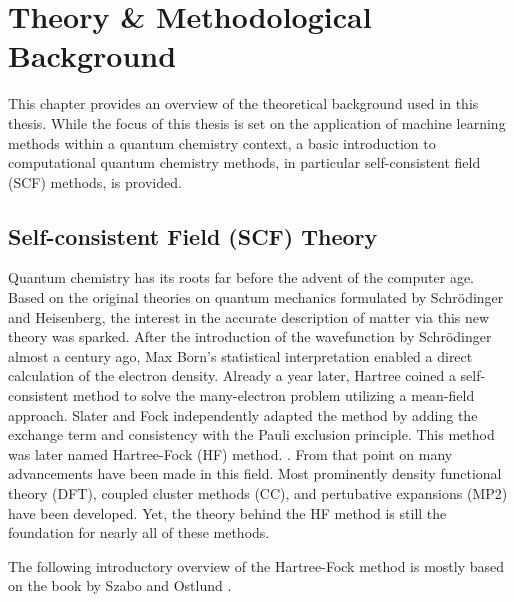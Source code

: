 \chapter{Theory \& Methodological Background}
\label{sec:background}
This chapter provides an overview of the theoretical background used in this thesis. While the focus of this thesis is set on the application of machine learning methods within a quantum chemistry context, a basic introduction to computational quantum chemistry methods, in particular self-consistent field (SCF) methods, is provided. 

\section{Self-consistent Field (SCF) Theory}
\label{sec:background_scf}
Quantum chemistry has its roots far before the advent of the computer age. Based on the original theories on quantum mechanics formulated by Schrödinger and Heisenberg, the interest in the accurate description of matter via this new theory was sparked. After the introduction of the wavefunction by Schrödinger almost a century ago, Max Born's statistical interpretation enabled a direct calculation of the electron density. \parencite{ref:schroedinger_1926undulatory} Already a year later, Hartree coined a self-consistent method to solve the many-electron problem utilizing a mean-field approach. Slater and Fock independently adapted the method by adding the exchange term and consistency with the Pauli exclusion principle. This method was later named Hartree-Fock (HF) method. \parencite{ref:Hartree_1928,ref:slater1930note,ref:fock1930naherungsmethode}. From that point on many advancements have been made in this field. Most prominently density functional theory (DFT), coupled cluster methods (CC), and pertubative expansions (MP2) have been developed. Yet, the theory behind the HF method is still the foundation for nearly all of these methods.

The following introductory overview of the Hartree-Fock method is mostly based on the book by Szabo and Ostlund \parencite{ref:szabo_ostlund}. 

